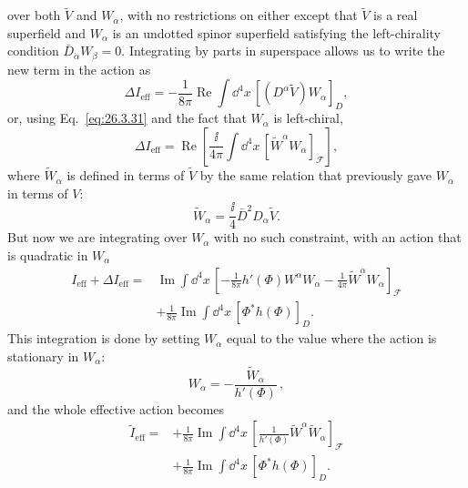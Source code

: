 over both \(\widetilde V\) and \(W_\alpha\), with no restrictions on either
except that \(\widetilde V\) is a real superfield and \(W_\alpha\) is an
undotted spinor superfield satisfying the left-chirality condition
\(\bar D_{\dot\alpha}W_\beta=0\). Integrating by parts in superspace
allows us to write the new term in the action as
\begin{equation}
  \Delta I_{\mathrm{eff}}
  =-\frac{1}{8\pi}\operatorname{Re}\int \dd^4x\,
    \left[
      \left(D^\alpha\widetilde V\right)W_\alpha
    \right]_D,
  \tag{29.5.26}\label{eq:29.5.26}
\end{equation}
or, using Eq.~\eqref{eq:26.3.31} and the fact that \(W_\alpha\) is
left-chiral,
\begin{equation}
  \Delta I_{\mathrm{eff}}
  =\operatorname{Re}\left[
    \frac{\ii}{4\pi}\int \dd^4x\,
    \left[
      \widetilde W^\alpha W_\alpha
    \right]_{\mathcal F}
  \right],
  \tag{29.5.27}\label{eq:29.5.27}
\end{equation}
where \(\widetilde W_\alpha\) is defined in terms of \(\widetilde V\) by
the same relation that previously gave \(W_\alpha\) in terms of \(V\):
\begin{equation}
  \widetilde W_\alpha
  =\frac{\ii}{4}\bar D^2D_\alpha\widetilde V.
  \tag{29.5.28}\label{eq:29.5.28}
\end{equation}
But now we are integrating over \(W_\alpha\) with no such constraint, with
an action that is quadratic in \(W_\alpha\)
\begin{equation}
  \begin{aligned}
  I_{\mathrm{eff}}+\Delta I_{\mathrm{eff}}
  ={}&\operatorname{Im}\int \dd^4x\,
  \left[
    -\frac{1}{8\pi}h'(\Phi)
      W^\alpha W_\alpha
    -\frac{1}{4\pi}
      \widetilde W^\alpha W_\alpha
  \right]_{\mathcal F}
  \\
  &+\frac{1}{8\pi}\operatorname{Im}\int \dd^4x\,
    \left[\Phi^*h(\Phi)\right]_D.
  \end{aligned}
  \tag{29.5.29}\label{eq:29.5.29}
\end{equation}
This integration is done by setting \(W_\alpha\) equal to the value where
the action is stationary in \(W_\alpha\):
\begin{equation}
  W_\alpha=-\frac{\widetilde W_\alpha}{h'(\Phi)}\,,
  \tag{29.5.30}\label{eq:29.5.30}
\end{equation}
and the whole effective action becomes
\begin{equation}
  \begin{aligned}
  \widetilde I_{\mathrm{eff}}
  ={}&+\frac{1}{8\pi}\operatorname{Im}\int \dd^4x\,
    \left[
      \frac{1}{h'(\Phi)}
      \widetilde W^\alpha\widetilde W_\alpha
    \right]_{\mathcal F}
  \\
  &+\frac{1}{8\pi}\operatorname{Im}\int \dd^4x\,
    \left[\Phi^*h(\Phi)\right]_D.
  \end{aligned}
  \tag{29.5.31}\label{eq:29.5.31}
\end{equation}

